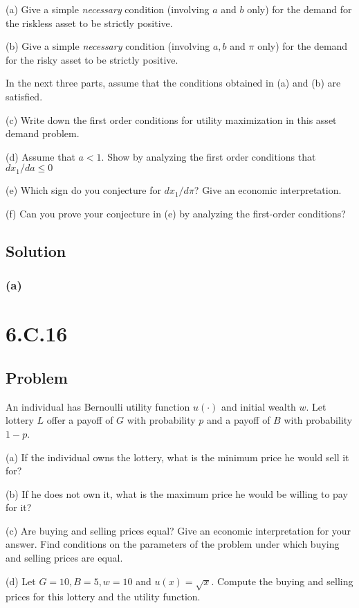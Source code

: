 \documentclass[10pt, a4paper]{article}
\begin{document}
      (a) Give a simple \textit{necessary} condition (involving $a$ and $b$ only) for the demand for the riskless asset to be strictly positive.

      (b) Give a simple \textit{necessary} condition (involving $a,b$ and $\pi$ only) for the demand for the risky asset to be strictly positive.
     
      In the next three parts, assume that the conditions obtained in (a) and (b) are satisfied.

      (c) Write down the first order conditions for utility maximization in this asset demand problem.

      (d) Assume that $a<1$. Show by analyzing the first order conditions that $dx_1/da\leq0$

      (e) Which sign do you conjecture for $dx_1/d\pi$? Give an economic interpretation.

      (f) Can you prove your conjecture in (e) by analyzing the first-order conditions?
    \subsection*{Solution}
      \subsubsection{(a)}
      

  \section*{6.C.16}
    \subsection*{Problem}
      An individual has Bernoulli utility function $u(\cdot)$ and initial wealth $w$. Let lottery $L$ offer a payoff of $G$ with probability $p$ and a payoff of $B$ with probability $1-p$.

      (a) If the individual owns the lottery, what is the minimum price he would sell it for?

      (b) If he does not own it, what is the maximum price he would be willing to pay for it?

      (c) Are buying and selling prices equal? Give an economic interpretation for your answer. Find conditions on the parameters of the problem under which buying and selling prices are equal.

      (d) Let $G=10, B=5, w=10$ and $u(x) = \sqrt{x}$. Compute the buying and selling prices for this lottery and the utility function. 
\end{document}
